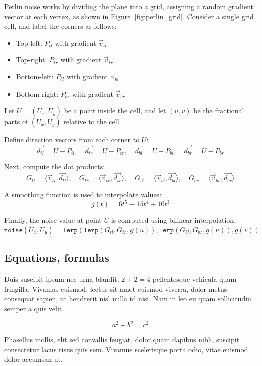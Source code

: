 Perlin noise works by dividing the plane into a grid, assigning a random gradient vector at each vertex, as shown in Figure~\ref{fig:perlin_grid}. Consider a single grid cell, and label the corners as follows:
\begin{itemize}
\item{Top-left: $P_{tl}$ with gradient $\vec{v}_{tl}$}
\item{Top-right: $P_{tr}$ with gradient $\vec{v}_{tr}$}
\item{Bottom-left: $P_{bl}$ with gradient $\vec{v}_{bl}$}
\item{Bottom-right: $P_{br}$ with gradient $\vec{v}_{br}$}
\end{itemize}

Let $U = (U_x, U_y)$ be a point inside the cell, and let $(u, v)$ be the fractional parts of $(U_x, U_y)$ relative to the cell.

Define direction vectors from each corner to $U$:
\[
\vec{d_{tl}} = U - P_{tl}, \quad \vec{d_{tr}} = U - P_{tr}, \quad \vec{d_{bl}} = U - P_{bl}, \quad \vec{d_{br}} = U - P_{br}
\]

Next, compute the dot products:
\[
G_{tl} = \langle \vec{v}_{tl}, \vec{d_{tl}} \rangle, \quad G_{tr} = \langle \vec{v}_{tr}, \vec{d_{tr}} \rangle, \quad G_{bl} = \langle \vec{v}_{bl}, \vec{d_{bl}} \rangle, \quad G_{br} = \langle \vec{v}_{br}, \vec{d_{br}} \rangle
\]

A smoothing function is used to interpolate values:
\[
g(t) = 6t^5 - 15t^4 + 10t^3
\]

Finally, the noise value at point $U$ is computed using bilinear interpolation:
\[
\texttt{noise}(U_x, U_y) = \texttt{lerp}(\texttt{lerp}(G_{tl}, G_{tr}, g(u)), \texttt{lerp}(G_{bl}, G_{br}, g(u)), g(v))
\]


\subsection{Equations, formulas}

Duis suscipit ipsum nec urna blandit, $2 + 2 = 4$ pellentesque vehicula quam fringilla. Vivamus euismod, lectus sit amet euismod viverra, dolor metus consequat sapien, ut hendrerit nisl nulla id nisi. Nam in leo eu quam sollicitudin semper a quis velit.

$$a^2 + b^2 = c^2$$

Phasellus mollis, elit sed convallis feugiat, dolor quam dapibus nibh, suscipit consectetur lacus risus quis sem. Vivamus scelerisque porta odio, vitae euismod dolor accumsan ut.


